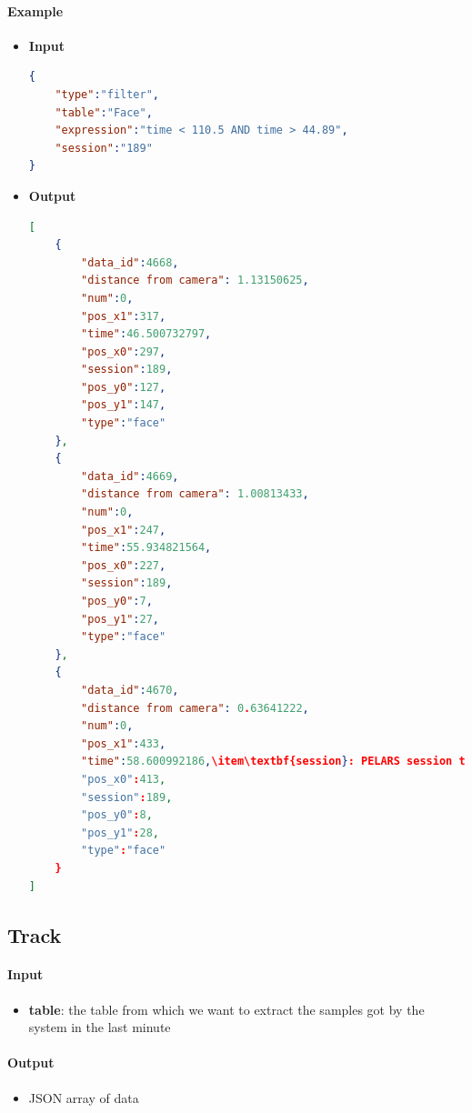 \documentclass[a4paper,notitlepage,onecolumn]{hitec}  %
\begin{document}
\paragraph{Example}
\begin{itemize}
\item\textbf{Input}
\begin{lstlisting}[language=json,firstnumber=1]
{  
	"type":"filter",
	"table":"Face",
	"expression":"time < 110.5 AND time > 44.89",
	"session":"189"
}
\end{lstlisting}
\item\textbf{Output}
\begin{lstlisting}[language=json,firstnumber=1]
[  
	{  
		"data_id":4668,
		"distance from camera": 1.13150625,
		"num":0,
		"pos_x1":317,
		"time":46.500732797,
		"pos_x0":297,
		"session":189,
		"pos_y0":127,
		"pos_y1":147,
		"type":"face"
	},
	{  
		"data_id":4669,
		"distance from camera": 1.00813433,
		"num":0,
		"pos_x1":247,
		"time":55.934821564,
		"pos_x0":227,
		"session":189,
		"pos_y0":7,
		"pos_y1":27,
		"type":"face"
	},
	{  
		"data_id":4670,
		"distance from camera": 0.63641222,
		"num":0,
		"pos_x1":433,
		"time":58.600992186,\item\textbf{session}: PELARS session the data to be processed belongs to
		"pos_x0":413,
		"session":189,
		"pos_y0":8,
		"pos_y1":28,
		"type":"face"
	}
]
\end{lstlisting}
\end{itemize}

\subsection{Track}

\paragraph{Input}
\begin{itemize}
\item\textbf{table}:  the table from which we want to extract the samples got by the system in the last minute
\end{itemize}

\paragraph{Output}
\begin{itemize}
\item JSON array of data
\end{itemize}
\end{document}
